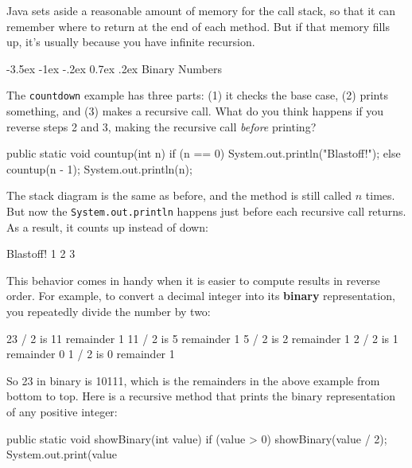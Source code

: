 \documentclass[12pt]{book}
\makeatletter
\theoremstyle{exercise}
\newcommand{\java}[1]{\verb"#1"}
\renewcommand{\section}{\@startsection{section}{1}{\z@}%
    {-3.5ex \@plus -1ex \@minus -.2ex}%
    {0.7ex \@plus.2ex}%
    {\normalfont\Large\bfseries}}
\newcommand{\java}[1]{\lstinline{#1}} %
\makeatother
\begin{document}
Java sets aside a reasonable amount of memory for the call stack, so that it can remember where to return at the end of each method.
But if that memory fills up, it's usually because you have infinite recursion.



\section{Binary Numbers}

The \java{countdown} example has three parts: (1) it checks the base case, (2) prints something, and (3) makes a recursive call.
What do you think happens if you reverse steps 2 and 3, making the recursive call {\it before} printing?

\begin{code}
    public static void countup(int n) {
        if (n == 0) {
            System.out.println("Blastoff!");
        } else {
            countup(n - 1);
            System.out.println(n);
        }
    }
\end{code}

The stack diagram is the same as before, and the method is still called $n$ times.
But now the \java{System.out.println} happens just before each recursive call returns.
As a result, it counts up instead of down:

\begin{stdout}
Blastoff!
1
2
3
\end{stdout}

This behavior comes in handy when it is easier to compute results in reverse order.
For example, to convert a decimal integer into its {\bf binary} representation, you repeatedly divide the number by two:

\begin{stdout}
23 / 2 is 11 remainder 1
11 / 2 is  5 remainder 1
 5 / 2 is  2 remainder 1
 2 / 2 is  1 remainder 0
 1 / 2 is  0 remainder 1
\end{stdout}

So 23 in binary is 10111, which is the remainders in the above example from bottom to top.
Here is a recursive method that prints the binary representation of any positive integer:

\begin{code}
    public static void showBinary(int value) {
        if (value > 0) {
            showBinary(value / 2);
            System.out.print(value %
        }
    }
\end{code}
\end{document}
